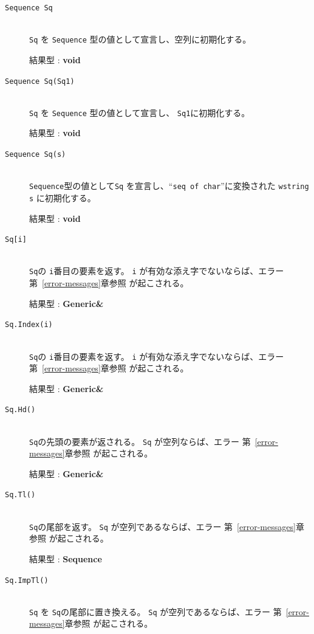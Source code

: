 \documentclass[\pformat,12pt]{jarticle}
\begin{document}
\begin{description}
\item[{\tt Sequence Sq}] \mbox{}\\
     {\tt Sq} を {\tt Sequence} 型の値として宣言し、空列に初期化する。

     結果型 : {\bf void}

\item[{\tt Sequence Sq(Sq1)}] \mbox{}\\
      {\tt Sq} を {\tt Sequence} 型の値として宣言し、 {\tt Sq1}に初期化する。

     結果型 : {\bf void}

\item[{\tt Sequence Sq(s)}] \mbox{}\\
     {\tt Sequence}型の値として{\tt Sq} を宣言し、``{\tt seq of char}''に変換された  {\tt wstring} {\tt s} に初期化する。

     結果型 : {\bf void}

\item[{\tt Sq[i]}] \mbox{}\\     
     {\tt Sq}の {\tt i}番目の要素を返す。 
 {\tt i} が有効な添え字でないならば、エラー 第~\ref{error-messages}章参照 が起こされる。

     結果型 : {\bf Generic\&}

\item[{\tt Sq.Index(i)}] \mbox{}\\     
      {\tt Sq}の {\tt i}番目の要素を返す。
 {\tt i} が有効な添え字でないならば、エラー 第~\ref{error-messages}章参照 が起こされる。

     結果型 : {\bf Generic\&}

\item[{\tt Sq.Hd()}] \mbox{}\\     
      {\tt Sq}の先頭の要素が返される。 {\tt Sq} が空列ならば、エラー 第~\ref{error-messages}章参照 が起こされる。

     結果型 : {\bf Generic\&}

\item[{\tt Sq.Tl()}] \mbox{}\\     
      {\tt Sq}の尾部を返す。 
 {\tt Sq} が空列であるならば、エラー 第~\ref{error-messages}章参照 が起こされる。

     結果型 : {\bf Sequence}

\item[{\tt Sq.ImpTl()}] \mbox{}\\     
      {\tt Sq} を {\tt Sq}の尾部に置き換える。
 {\tt Sq} が空列であるならば、エラー 第~\ref{error-messages}章参照 が起こされる。


\end{description}
\end{document}
